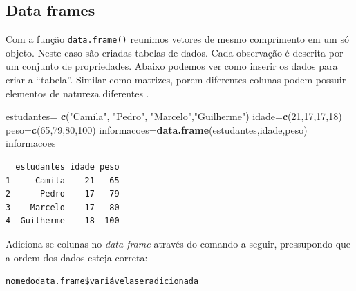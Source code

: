 \documentclass[12pt,brazil,]{book}
\newenvironment{Shaded}{\begin{snugshade}}{\end{snugshade}}
\newcommand{\DecValTok}[1]{\textcolor[rgb]{0.00,0.00,0.81}{#1}}
\newcommand{\KeywordTok}[1]{\textcolor[rgb]{0.13,0.29,0.53}{\textbf{#1}}}
\newcommand{\NormalTok}[1]{#1}
\newcommand{\OperatorTok}[1]{\textcolor[rgb]{0.81,0.36,0.00}{\textbf{#1}}}
\newcommand{\StringTok}[1]{\textcolor[rgb]{0.31,0.60,0.02}{#1}}
\begin{document}
\hypertarget{data-frames}{%
\subsection{Data frames}\label{data-frames}}

Com a função \texttt{data.frame()} reunimos vetores de mesmo comprimento
em um só objeto. Neste caso são criadas tabelas de dados. Cada
observação é descrita por um conjunto de propriedades. Abaixo podemos
ver como inserir os dados para criar a ``tabela''. Similar como
matrizes, porem diferentes colunas podem possuir elementos de natureza
diferentes .

\begin{Shaded}
\begin{Highlighting}[]
\NormalTok{estudantes=}\StringTok{ }\KeywordTok{c}\NormalTok{(}\StringTok{"Camila"}\NormalTok{, }\StringTok{"Pedro"}\NormalTok{, }\StringTok{"Marcelo"}\NormalTok{,}\StringTok{"Guilherme"}\NormalTok{)}
\NormalTok{idade=}\KeywordTok{c}\NormalTok{(}\DecValTok{21}\NormalTok{,}\DecValTok{17}\NormalTok{,}\DecValTok{17}\NormalTok{,}\DecValTok{18}\NormalTok{)}
\NormalTok{peso=}\KeywordTok{c}\NormalTok{(}\DecValTok{65}\NormalTok{,}\DecValTok{79}\NormalTok{,}\DecValTok{80}\NormalTok{,}\DecValTok{100}\NormalTok{)}
\NormalTok{informacoes=}\KeywordTok{data.frame}\NormalTok{(estudantes,idade,peso)}
\NormalTok{informacoes}
\end{Highlighting}
\end{Shaded}

\begin{verbatim}
  estudantes idade peso
1     Camila    21   65
2      Pedro    17   79
3    Marcelo    17   80
4  Guilherme    18  100
\end{verbatim}

Adiciona-se colunas no \emph{data frame} através do comando a seguir,
pressupondo que a ordem dos dados esteja correta:

\texttt{nomedodata.frame\$variávelaseradicionada}

\begin{Shaded}
\end{Shaded}
\end{document}
